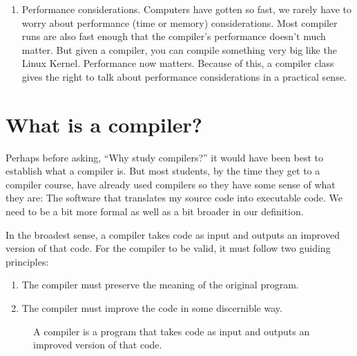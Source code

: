 \documentclass[letterpaper,12pt,openany,reqno]{book}%
\newcommand{\code}[1] {\lstinline[breaklines=yes,breakatwhitespace=yes]{#1}}
\begin{document}
\begin{enumerate}
\item Performance considerations. Computers have gotten so fast, we rarely have to worry about performance (time or memory) considerations. Most compiler runs are also fast enough that the compiler's performance doesn't much matter. But given a compiler, you can compile something very big like the Linux Kernel. Performance now matters. Because of this, a compiler class gives the right to talk about performance considerations in a practical sense.

\end{enumerate}

\section{What is a compiler?}
Perhaps before asking, ``Why study compilers?'' it would have been best to establish what a compiler is. But most students, by the time they get to a compiler course, have already used compilers so they have some sense of what they are: The software that translates my source code into executable code. We need to be a bit more formal as well as a bit broader in our definition.

In the broadest sense, a compiler takes code as input and outputs an improved version of that code. For the compiler to be valid, it must follow two guiding principles:
\begin{enumerate}
\item The compiler must preserve the meaning of the original program.
\item The compiler must improve the code in some discernible way.
\end{enumerate}

\begin{figure}[hbt]
\centering
{}
 \caption[What is a Compiler]{A compiler is a program that takes code as input and outputs an improved version of that code.}
  \label{F.whatiscompiler}
\end{figure}
\end{document}

